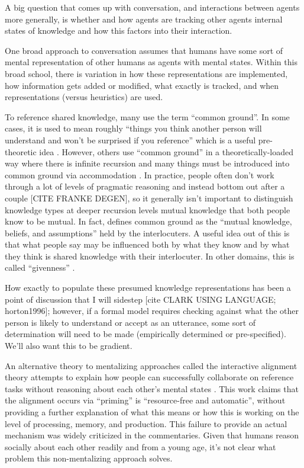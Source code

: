 \documentclass[]{article}
\begin{document}
A big question that comes up with conversation, and interactions between agents more generally, is whether and how agents are tracking other agents internal states of knowledge and how this factors into their interaction.

One broad approach to conversation assumes that humans have some sort of mental representation of other humans as agents with mental states. Within this broad school, there is variation in how these representations are implemented, how information gets added or modified, what exactly is tracked, and when representations (versus heuristics) are used. 

To reference shared knowledge, many use the term ``common ground''. In some cases, it is used to mean roughly ``things you think another person will understand and won't be surprised if you reference'' which is a useful pre-theoretic idea \cite{leung2023}. However, others use ``common ground'' in a theoretically-loaded way where there is infinite recursion and many things must be introduced into common ground via accommodation \cite{horton1996}. In practice, people often don't work through a lot of levels of pragmatic reasoning and instead bottom out after a couple [CITE FRANKE DEGEN], so it generally isn't important to distinguish knowledge types at deeper recursion levels mutual knowledge that both people know to be mutual. In fact, \cite{hanna2003} defines common ground as the ``mutual knowledge, beliefs, and assumptions'' held by the interlocuters. A useful idea out of this is that what people say may be influenced both by what they know and by what they think is shared knowledge with their interlocuter. In other domains, this is called ``givenness'' \cite{fay2010}.  

How exactly to populate these presumed knowledge representations has been a point of discussion that I will sidestep [cite CLARK USING LANGUAGE; horton1996]; however, if a formal model requires checking against what the other person is likely to understand or accept as an utterance, some sort of determination will need to be made (empirically determined or pre-specified). We'll also want this to be gradient. 

An alternative theory to mentalizing approaches called the interactive alignment theory attempts to explain how people can successfully collaborate on reference tasks without reasoning about each other's mental states \cite{pickering2004, gandolfi2022}. This work claims that the alignment occurs via ``priming'' is ``resource-free and automatic'', without providing a further explanation of what this means or how this is working on the level of processing, memory, and production\cite{pickering2004}. This failure to provide an actual mechanism was widely criticized in the commentaries. Given that humans reason socially about each other readily and from a young age, it's not clear what problem this non-mentalizing approach solves. 
\end{document}
